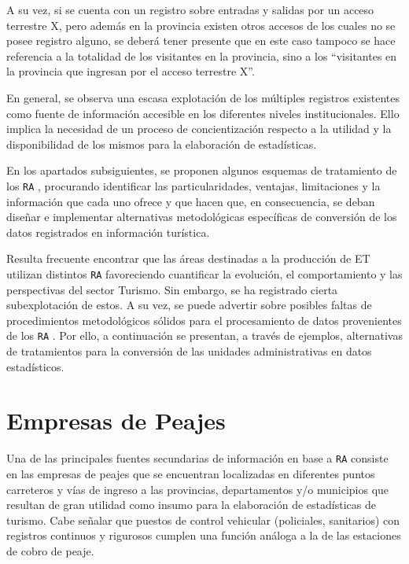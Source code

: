 \documentclass[
]{book}
\begin{document}
A su vez, si se cuenta con un registro sobre entradas y salidas por un acceso terrestre X, pero además en la provincia existen otros accesos de los cuales no se posee registro alguno, se deberá tener presente que en este caso tampoco se hace referencia a la totalidad de los visitantes en la provincia, sino a los ``visitantes en la provincia que ingresan por el acceso terrestre X''.

En general, se observa una escasa explotación de los múltiples registros existentes como fuente de información accesible en los diferentes niveles institucionales. Ello implica la necesidad de un proceso de concientización respecto a la utilidad y la disponibilidad de los mismos para la elaboración de estadísticas.

En los apartados subsiguientes, se proponen algunos esquemas de tratamiento de los \texttt{RA} , procurando identificar las particularidades, ventajas, limitaciones y la información que cada uno ofrece y que hacen que, en consecuencia, se deban diseñar e implementar alternativas metodológicas específicas de conversión de los datos registrados en información turística.

Resulta frecuente encontrar que las áreas destinadas a la producción de ET utilizan distintos \texttt{RA} favoreciendo cuantificar la evolución, el comportamiento y las perspectivas del sector Turismo. Sin embargo, se ha registrado cierta subexplotación de estos. A su vez, se puede advertir sobre posibles faltas de procedimientos metodológicos sólidos para el procesamiento de datos provenientes de los \texttt{RA} . Por ello, a continuación se presentan, a través de ejemplos, alternativas de tratamientos para la conversión de las unidades administrativas en datos estadísticos.

\hypertarget{empresas-de-peajes}{%
\section{Empresas de Peajes}\label{empresas-de-peajes}}

Una de las principales fuentes secundarias de información en base a \texttt{RA} consiste en las empresas de peajes que se encuentran localizadas en diferentes puntos carreteros y vías de ingreso a las provincias, departamentos y/o municipios que resultan de gran utilidad como insumo para la elaboración de estadísticas de turismo. Cabe señalar que puestos de control vehicular (policiales, sanitarios) con registros continuos y rigurosos cumplen una función análoga a la de las estaciones de cobro de peaje.
\end{document}
